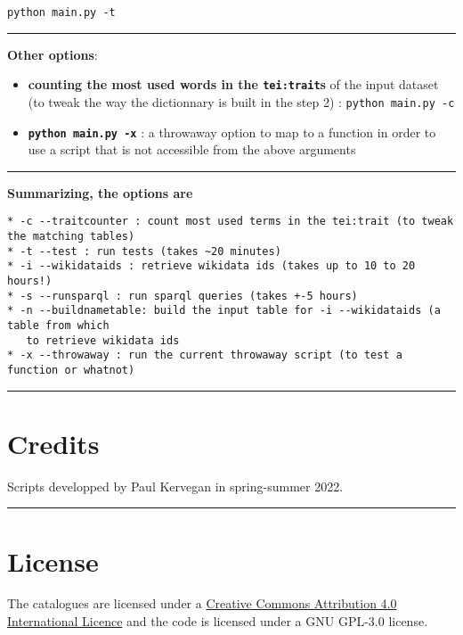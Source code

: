 \begin{lstlisting}
python main.py -t
\end{lstlisting}

\par\noindent\rule{\linewidth}{0.4pt}

\textbf{Other options}:

\begin{itemize}
\item \textbf{counting the most used words in the \texttt{tei:trait}s} of the input dataset (to tweak the way the dictionnary is built in the step 2) : \texttt{python main.py -c}
\item \textbf{\texttt{python main.py -x}} : a throwaway option to map to a function in order to use a script that is not accessible from the above arguments 
\end{itemize}

\par\noindent\rule{\linewidth}{0.4pt}

\textbf{Summarizing, the options are}

\begin{lstlisting}
* -c --traitcounter : count most used terms in the tei:trait (to tweak the matching tables)
* -t --test : run tests (takes ~20 minutes)
* -i --wikidataids : retrieve wikidata ids (takes up to 10 to 20 hours!)
* -s --runsparql : run sparql queries (takes +-5 hours)
* -n --buildnametable: build the input table for -i --wikidataids (a table from which 
   to retrieve wikidata ids
* -x --throwaway : run the current throwaway script (to test a function or whatnot)
\end{lstlisting}

\par\noindent\rule{\linewidth}{0.4pt}
\section*{Credits}

Scripts developped by Paul Kervegan in spring-summer 2022. 

\par\noindent\rule{\linewidth}{0.4pt}
\section*{License}

The catalogues are licensed under a \href{http://creativecommons.org/licenses/by/4.0/}{Creative Commons Attribution 4.0 International Licence} and the code is licensed under a GNU GPL-3.0 license.
